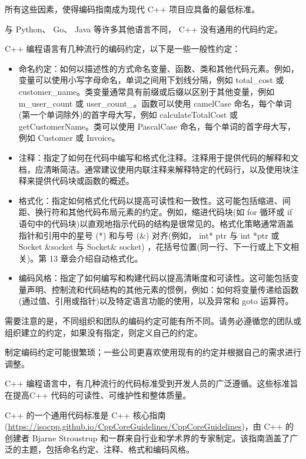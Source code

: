 所有这些因素，使得编码指南成为现代 C++ 项目应具备的最低标准。


与 Python、 Go、 Java 等许多其他语言不同， C++ 没有通用的代码约定。

C++ 编程语言有几种流行的编码约定，以下是一些一般性约定：

\begin{itemize}
\item
命名约定：如何以描述性的方式命名变量、函数、类和其他代码元素。例如，变量可以使用小写字母命名，单词之间用下划线分隔，例如 total\_cost 或 customer\_name。类变量通常具有前缀或后缀以区别于其他变量，例如 m\_user\_count 或 user\_count\_。函数可以使用 camelCase 命名，每个单词(第一个单词除外)的首字母大写，例如 calculateTotalCost 或 getCustomerName。类可以使用 PascalCase 命名，每个单词的首字母大写，例如 Customer 或 Invoice。

\item
注释：指定了如何在代码中编写和格式化注释。注释用于提供代码的解释和文档，应清晰简洁。通常建议使用内联注释来解释特定的代码行，以及使用块注释来提供代码块或函数的概述。

\item
格式化：指定如何格式化代码以提高可读性和一致性。这可能包括缩进、间距、换行符和其他代码布局元素的约定。例如，缩进代码块(如 for 循环或 if 语句中的代码块)以直观地指示代码的结构是很常见的。格式化策略通常涵盖指针和引用中的星号 (*) 和与号 (\&) 对齐(例如， int* ptr 与 int *ptr 或 Socket \&socket 与 Socket\& socket) ，花括号位置(同一行、下一行或上下文相关)。第 13 章会介绍自动格式化。

\item
编码风格：指定了如何编写和构建代码以提高清晰度和可读性。这可能包括变量声明、控制流和代码结构的其他元素的惯例，例如：如何将变量传递给函数(通过值、引用或指针)以及特定语言功能的使用，以及异常和 goto 运算符。
\end{itemize}

需要注意的是，不同组织和团队的编码约定可能有所不同。请务必遵循您的团队或组织建立的约定，如果没有指定，则定义自己的约定。

制定编码约定可能很繁琐；一些公司更喜欢使用现有的约定并根据自己的需求进行调整。

C++ 编程语言中，有几种流行的代码标准受到开发人员的广泛遵循。这些标准旨在提高C++ 代码的可读性、可维护性和整体质量。

C++ 的一个通用代码标准是 C++ 核心指南 (\url{https://isocpp.github.io/CppCoreGuidelines/CppCoreGuidelines})，由 C++ 的创建者 Bjarne Stroustrup 和一群来自行业和学术界的专家制定。该指南涵盖了广泛的主题，包括命名约定、注释、格式和编码风格。

